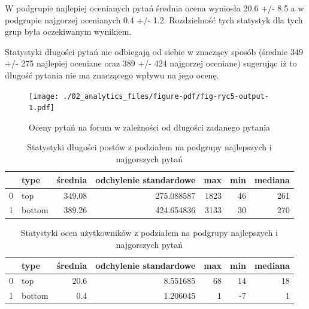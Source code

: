 \documentclass[
  letterpaper,
  DIV=11,
  numbers=noendperiod]{scrreprt}
\begin{document}
W podgrupie najlepiej ocenianych pytań średnia ocena wyniosła 20.6 +/-
8.5 a w podgrupie najgorzej ocenianych 0.4 +/- 1.2. Rozdzielność tych
statystyk dla tych grup była oczekiwanym wynikiem.

Statystyki długości pytań nie odbiegają od siebie w znaczący sposób
(średnie 349 +/- 275 najlepiej oceniane oraz 389 +/- 424 najgorzej
oceniane) sugerując iż to długość pytania nie ma znaczącego wpływu na
jego ocenę.

\begin{figure}

{\centering \texttt{[image: ./02\_analytics\_files/figure-pdf/fig-ryc5-output-1.pdf]}

}

\caption{\label{fig-ryc5}Oceny pytań na forum w zależności od długości
zadanego pytania}

\end{figure}

\hypertarget{tbl-q_stats_types}{}
\begin{table}
\caption{\label{tbl-q_stats_types}Statystyki długości postów z podziałem na podgrupy najlepszych i
najgorszych pytań }\tabularnewline

\centering
\begin{tabular}{llrrrrr}
\toprule
{} &    type &  średnia &  odchylenie standardowe &   max &  min &  mediana \\
\midrule
0 &     top &   349.08 &              275.088587 &  1823 &   46 &      261 \\
1 &  bottom &   389.26 &              424.654836 &  3133 &   30 &      270 \\
\bottomrule
\end{tabular}
\end{table}

\hypertarget{tbl-score_stats_types}{}
\begin{table}
\caption{\label{tbl-score_stats_types}Statystyki ocen użytkowników z podziałem na podgrupy najlepszych i
najgorszych pytań }\tabularnewline

\centering
\begin{tabular}{llrrrrr}
\toprule
{} &    type &  średnia &  odchylenie standardowe &  max &  min &  mediana \\
\midrule
0 &     top &     20.6 &                8.551685 &   68 &   14 &       18 \\
1 &  bottom &      0.4 &                1.206045 &    1 &   -7 &        1 \\
\bottomrule
\end{tabular}
\end{table}
\end{document}
